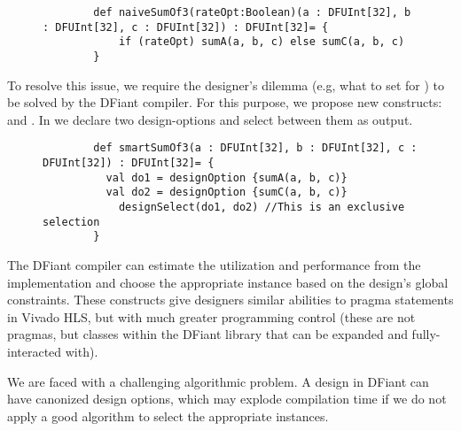   \begin{figure}[h]
	\centering
	\begin{minipage}{\linewidth}
		\begin{verbatim}
		def naiveSumOf3(rateOpt:Boolean)(a : DFUInt[32], b : DFUInt[32], c : DFUInt[32]) : DFUInt[32]= {
			if (rateOpt) sumA(a, b, c) else sumC(a, b, c)
		}
		\end{verbatim}
	\end{minipage}
	\label{fig:naiveSumOf3}
\end{figure}

To resolve this issue, we require the designer's dilemma (e.g, what to set for ) to be solved by the DFiant compiler. For this purpose, we propose new constructs:  and . In  we declare two design-options and select between them as output.
  \begin{figure}[h]
	\centering
	\begin{minipage}{\linewidth}
		\begin{verbatim}
		def smartSumOf3(a : DFUInt[32], b : DFUInt[32], c : DFUInt[32]) : DFUInt[32]= {
		  val do1 = designOption {sumA(a, b, c)}
		  val do2 = designOption {sumC(a, b, c)}
			designSelect(do1, do2) //This is an exclusive selection
		}
		\end{verbatim}
	\end{minipage}
	\label{fig:smartSumOf3}
\end{figure}

The DFiant compiler can estimate the utilization and performance from the implementation and choose the appropriate instance based on the design's global constraints. These constructs give designers similar abilities to pragma statements in Vivado HLS, but with much greater programming control (these are not pragmas, but classes within the DFiant library that can be expanded and fully-interacted with).

We are faced with a challenging algorithmic problem. A design in DFiant can have canonized design options, which may explode compilation time if we do not apply a good algorithm to select the appropriate instances. 


